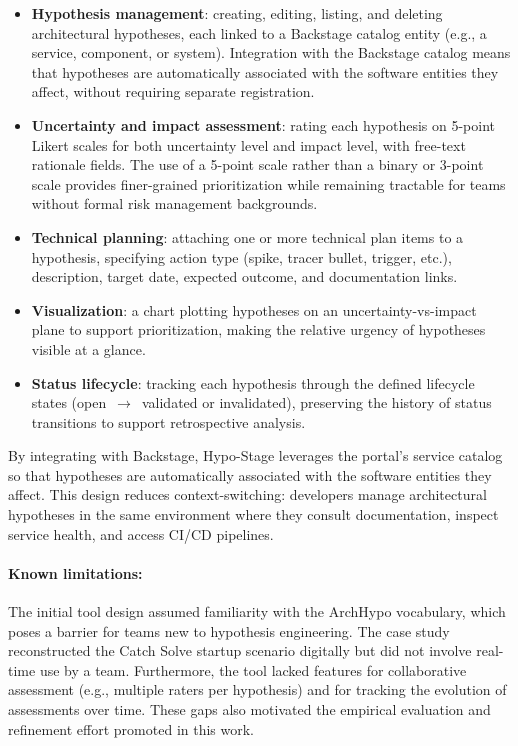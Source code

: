 \begin{itemize}
  \item \textbf{Hypothesis management}: creating, editing, listing, and deleting
  architectural hypotheses, each linked to a Backstage catalog entity (e.g., a
  service, component, or system). Integration with the Backstage catalog means that
  hypotheses are automatically associated with the software entities they affect, without
  requiring separate registration.

  \item \textbf{Uncertainty and impact assessment}: rating each hypothesis on 5-point
  Likert scales for both uncertainty level and impact level, with free-text rationale
  fields. The use of a 5-point scale rather than a binary or 3-point scale provides
  finer-grained prioritization while remaining tractable for teams without formal risk
  management backgrounds.

  \item \textbf{Technical planning}: attaching one or more technical plan items to a
  hypothesis, specifying action type (spike, tracer bullet, trigger, etc.), description,
  target date, expected outcome, and documentation links.

  \item \textbf{Visualization}: a chart plotting hypotheses on an
  uncertainty-vs-impact plane to support prioritization, making the relative urgency of
  hypotheses visible at a glance.

  \item \textbf{Status lifecycle}: tracking each hypothesis through the defined lifecycle
  states (open~$\rightarrow$~validated or invalidated), preserving the history of status
  transitions to support retrospective analysis.
\end{itemize}

By integrating with Backstage, Hypo-Stage leverages the portal's service catalog so
that hypotheses are automatically associated with the software entities they affect. This
design reduces context-switching: developers manage architectural hypotheses in the
same environment where they consult documentation, inspect service health, and access
CI/CD pipelines.

\paragraph{Known limitations:} The initial tool design assumed familiarity with the
ArchHypo vocabulary, which poses a barrier for teams new to hypothesis engineering.
The case study \citep{correa2025} reconstructed the Catch Solve startup scenario
digitally but did not involve real-time use by a team. Furthermore, the tool lacked
features for collaborative assessment (e.g., multiple raters per hypothesis) and for
tracking the evolution of assessments over time. These gaps also motivated the empirical
evaluation and refinement effort promoted in this work.

